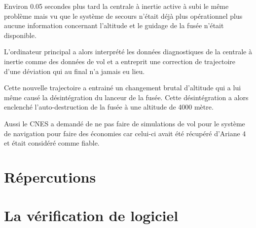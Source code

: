 \documentclass[12pt]{report}
\begin{document}
Environ 0.05 secondes plus tard la centrale à inertie active à subi le même problème mais vu que le système de secours n'était déjà plus opérationnel plus aucune information concernant l'altitude et le guidage de la fusée n'était disponible.   

L'ordinateur principal a alors interprété les données diagnostiques de la centrale à inertie comme des données de vol et a entreprit une correction de trajectoire d'une déviation qui au final n'a jamais eu lieu.
  
Cette nouvelle trajectoire a entrainé un changement brutal d'altitude qui a lui même causé la désintégration du lanceur de la fusée. Cette désintégration a alors  enclenché l'auto-destruction de la fusée à une altitude de 4000 mètre.

Aussi le \gls{CNES} a demandé de ne pas faire de simulations de vol pour le système de navigation pour faire des économies car celui-ci avait été récupéré d'Ariane 4 et était considéré comme fiable.

\section{Répercutions}
\section{La vérification de logiciel}

\printglossaries
\printbibliography
\end{document}
